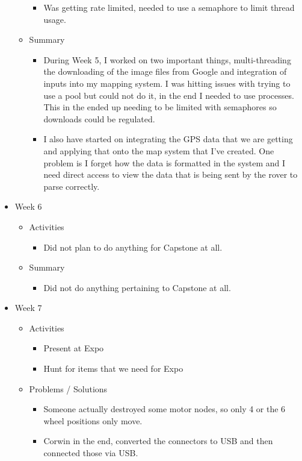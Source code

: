 \begin{itemize}
\begin{itemize}
\begin{itemize}
\item Was getting rate limited, needed to use a semaphore to limit thread usage.
\end{itemize}
\item Summary
\begin{itemize}
\item During Week 5, I worked on two important things, multi-threading the downloading of the image files from Google and integration of inputs into my mapping system. I was hitting issues with trying to use a pool but could not do it, in the end I needed to use processes. This in the ended up needing to be limited with semaphores so downloads could be regulated.
\item I also have started on integrating the GPS data that we are getting and applying that onto the map system that I've created. One problem is I forget how the data is formatted in the system and I need direct access to view the data that is being sent by the rover to parse correctly.
\end{itemize}
\end{itemize}
\item Week 6
\begin{itemize}
\item Activities
\begin{itemize}
\item Did not plan to do anything for Capstone at all.
\end{itemize}
\item Summary
\begin{itemize}
\item Did not do anything pertaining to Capstone at all.
\end{itemize}
\end{itemize}
\item Week 7
\begin{itemize}
\item Activities
\begin{itemize}
\item Present at Expo
\item Hunt for items that we need for Expo
\end{itemize}
\item Problems / Solutions
\begin{itemize}
\item Someone actually destroyed some motor nodes, so only 4 or the 6 wheel positions only move.
\item Corwin in the end, converted the connectors to USB and then connected those via USB.

\end{itemize}
\end{itemize}
\end{itemize}
